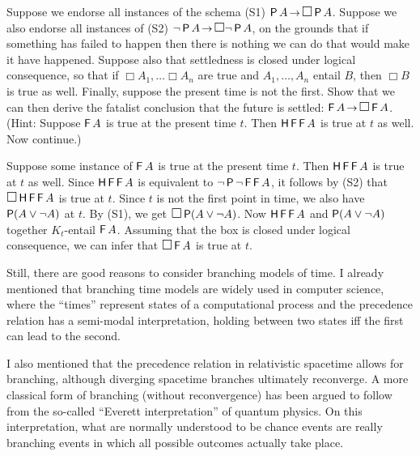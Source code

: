 \begin{exercise}
  Suppose we endorse all instances of the schema (S1) $\tP A \to \Box \tP A$.
  Suppose we also endorse all instances of (S2)
  $\neg \tP A \to \Box \neg \tP A$, on the grounds that if something has failed to
  happen then there is nothing we can do that would make it have happened.
  Suppose also that settledness is closed under logical consequence, so that if
  $\Box A_{1},\ldots \Box A_{n}$ are true and $A_{1},\ldots,A_{n}$ entail $B$,
  then $\Box B$ is true as well. Finally, suppose the present time is not the
  first. Show that we can then derive the fatalist conclusion that the future is
  settled: $\tF A \to \Box \tF A$. (Hint: Suppose $\operatorname{\mathsf{F}} A$ is true at the present time $t$. Then $\operatorname{\mathsf{H}} \operatorname{\mathsf{F}}\operatorname{\mathsf{F}} A$ is true at $t$ as well. Now continue.)
\end{exercise}
\begin{solution}
  Suppose some instance of $\operatorname{\mathsf{F}} A$ is true at the present time $t$. Then
  $\operatorname{\mathsf{H}} \operatorname{\mathsf{F}} \operatorname{\mathsf{F}} A$ is true at $t$ as well. Since $\operatorname{\mathsf{H}} \operatorname{\mathsf{F}} \operatorname{\mathsf{F}} A$ is equivalent to
  $\neg \operatorname{\mathsf{P}} \neg \operatorname{\mathsf{F}} \operatorname{\mathsf{F}} A$, it follows by (S2) that $\Box \tH \tF \tF A$ is
  true at $t$. Since $t$ is not the first point in time, we also have
  $\operatorname{\mathsf{P}}(A \lor \neg A)$ at $t$. By (S1), we get $\Box \tP(A \lor \neg A)$. Now
  $\operatorname{\mathsf{H}} \operatorname{\mathsf{F}} \operatorname{\mathsf{F}} A$ and $\operatorname{\mathsf{P}}(A \lor \neg A)$ together $K_{t}$-entail $\operatorname{\mathsf{F}} A$.
  Assuming that the box is closed under logical consequence, we can infer that
  $\Box \tF A$ is true at $t$.
\end{solution}


Still, there are good reasons to consider branching models of time. I already
mentioned that branching time models are widely used in computer science, where
the ``times'' represent states of a computational process and the precedence
relation has a semi-modal interpretation, holding between two states iff the
first can lead to the second.

I also mentioned that the precedence relation in relativistic spacetime allows
for branching, although diverging spacetime branches ultimately reconverge. A
more classical form of branching (without reconvergence) has been argued to
follow from the so-called ``Everett interpretation'' of quantum physics. On this
interpretation, what are normally understood to be chance events are really
branching events in which all possible outcomes actually take place.

